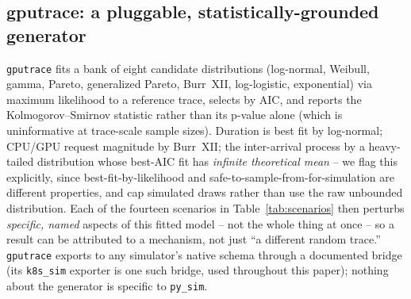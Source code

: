 \documentclass[11pt]{article}
\begin{document}
\subsection{gputrace: a pluggable, statistically-grounded generator}
\label{sec:stat-model}
\texttt{gputrace} fits a bank of eight candidate distributions (log-normal,
Weibull, gamma, Pareto, generalized Pareto, Burr~XII, log-logistic,
exponential) via maximum likelihood to a reference trace, selects by AIC,
and reports the Kolmogorov--Smirnov statistic rather than its p-value
alone (which is uninformative at trace-scale sample sizes). Duration is
best fit by log-normal; CPU/GPU request magnitude by Burr~XII; the
inter-arrival process by a heavy-tailed distribution whose best-AIC fit
has \emph{infinite theoretical mean} -- we flag this explicitly, since
best-fit-by-likelihood and safe-to-sample-from-for-simulation are
different properties, and cap simulated draws rather than use the raw
unbounded distribution. Each of the fourteen scenarios in
Table~\ref{tab:scenarios} then perturbs \emph{specific, named} aspects of
this fitted model -- not the whole thing at once -- so a result can be
attributed to a mechanism, not just ``a different random trace.''
\texttt{gputrace} exports to any simulator's native schema through a
documented bridge (its \texttt{k8s\_sim} exporter is one such bridge, used
throughout this paper); nothing about the generator is specific to
\texttt{py\_sim}.
\end{document}
